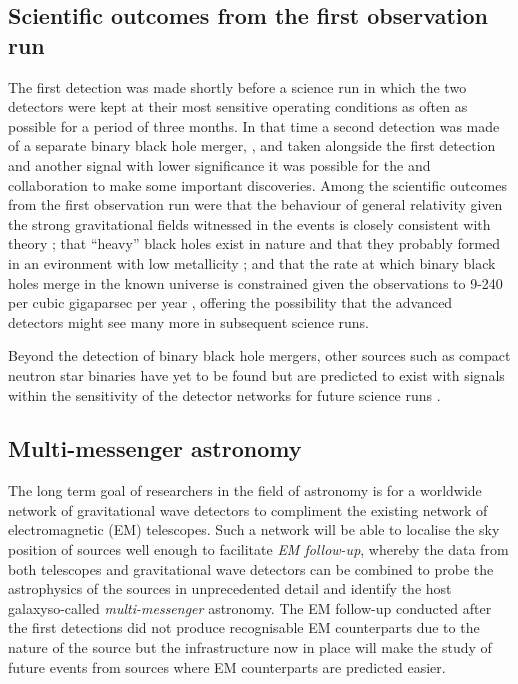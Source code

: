 \subsection{Scientific outcomes from the first observation run}
The first detection was made shortly before a science run in which the two \LIGO{} detectors were kept at their most sensitive operating conditions as often as possible for a period of three months. In that time a second detection was made of a separate binary black hole merger, \GWSECONDEVENT{} \cite{Abbott2016b}, and taken alongside the first detection and another signal with lower significance it was possible for the \LSC{} and \VIRGO{} collaboration to make some important discoveries. Among the scientific outcomes from the first observation run were that the behaviour of general relativity given the strong gravitational fields witnessed in the events is closely consistent with theory \cite{Abbott2016c}; that ``heavy'' black holes exist in nature and that they probably formed in an evironment with low metallicity \cite{Abbott2016d}; and that the rate at which binary black holes merge in the known universe is constrained given the observations to 9-240 per cubic gigaparsec per year \cite{lscvirgoo1}, offering the possibility that the advanced detectors might see many more in subsequent science runs.

Beyond the detection of binary black hole mergers, other sources such as compact neutron star binaries have yet to be found but are predicted to exist with signals within the sensitivity of the detector networks for future science runs \cite{Abbott2016f}.

\subsection{Multi-messenger astronomy}
The long term goal of researchers in the field of astronomy is for a worldwide network of gravitational wave detectors to compliment the existing network of electromagnetic (\gls{EM}) telescopes. Such a network will be able to localise the sky position of sources well enough to facilitate \emph{\gls{EM} follow-up}, whereby the data from both telescopes and gravitational wave detectors can be combined to probe the astrophysics of the sources in unprecedented detail and identify the host galaxy\textemdash so-called \emph{multi-messenger} astronomy. The \gls{EM} follow-up conducted after the first detections did not produce recognisable \gls{EM} counterparts due to the nature of the source \cite{Abbott2016e} but the infrastructure now in place will make the study of future events from sources where \gls{EM} counterparts are predicted easier.


